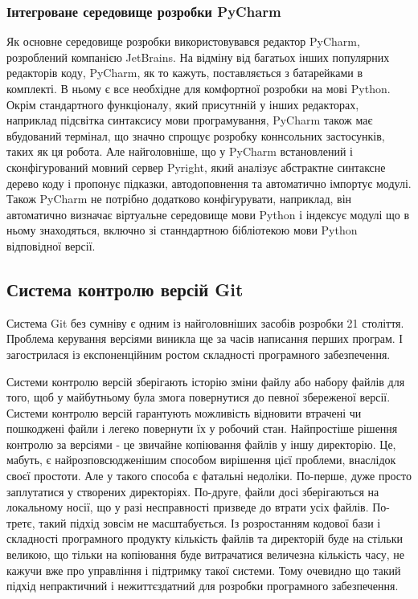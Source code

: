 \subsubsection{Інтегроване середовище розробки PyCharm}
Як основне середовище розробки використовувався редактор PyCharm, 
розроблений компанією JetBrains. На відміну від багатьох інших
популярних редакторів коду, PyCharm, як то кажуть, поставляється з батарейками
в комплекті. В ньому є все необхідне для комфортної розробки на мові
Python. Окрім стандартного функціоналу, який присутнній у інших
редакторах, наприклад підсвітка синтаксису мови програмування,
PyCharm також має вбудований термінал, що значно спрощує розробку
коннсольних застосунків, таких як ця робота. Але найголовніше,
що у PyCharm встановлений і сконфігурований мовний сервер Pyright,
який аналізує абстрактне синтаксне дерево коду і пропонує підказки,
автодоповнення та автоматично імпортує модулі. Також PyCharm не потрібно
додатково конфігурувати, наприклад, він автоматично визначає віртуальне
середовище мови Python і індексує модулі що в ньому знаходяться,
включно зі станндартною бібліотекою мови Python відповідної версії.

\subsection{Система контролю версій Git}
Система Git без сумніву є одним із найголовніших засобів розробки 21 століття. Проблема
керування версіями виникла ще за часів написання перших програм. І загострилася із
експоненційним ростом складності програмного забезпечення.

Системи контролю версій зберігають історію зміни файлу або набору файлів для того,
щоб у майбутньому була змога
повернутися до певної збереженої версії. Системи контролю версій гарантують можливість
відновити втрачені чи пошкоджені файли і легеко повернути їх у робочий стан. Найпростіше
рішення контролю за версіями - це звичайне копіювання файлів у іншу директорію. Це, мабуть,
є найрозповсюдженішим способом вирішення цієї проблеми, внаслідок своєї простоти.
Але у такого способа є фатальні недоліки. По-перше, дуже просто заплутатися у створених
директоріях. По-друге, файли досі зберігаються на локальному носії, що у разі
несправності призведе до втрати усіх файлів. По-третє, такий підхід зовсім 
не масштабується. Із розростанням кодової бази і складності програмного продукту кількість
файлів та директорій буде на стільки великою, що тільки на копіювання буде витрачатися
величезна кількість часу, не кажучи вже про управління і підтримку такої системи.
Тому очевидно що такий підхід непрактичний і нежиттєздатний для розробки програмного
забезпечення.

